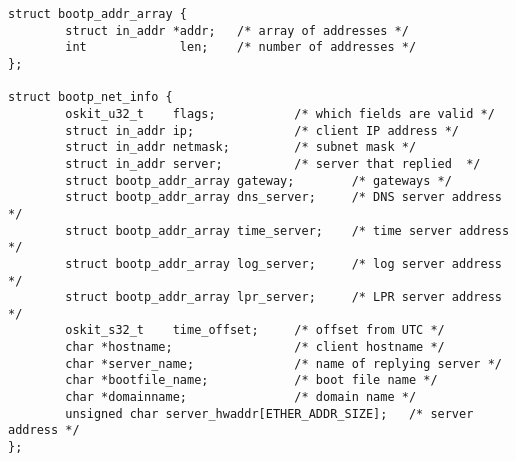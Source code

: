 \begin{apisyn}
\begin{codefrag}
\small
\begin{verbatim}
struct bootp_addr_array {
        struct in_addr *addr;   /* array of addresses */
        int             len;    /* number of addresses */
};

struct bootp_net_info {
        oskit_u32_t    flags;           /* which fields are valid */
        struct in_addr ip;              /* client IP address */
        struct in_addr netmask;         /* subnet mask */
        struct in_addr server;          /* server that replied  */
        struct bootp_addr_array gateway;        /* gateways */
        struct bootp_addr_array dns_server;     /* DNS server address  */
        struct bootp_addr_array time_server;    /* time server address  */
        struct bootp_addr_array log_server;     /* log server address  */
        struct bootp_addr_array lpr_server;     /* LPR server address  */
        oskit_s32_t    time_offset;     /* offset from UTC */
        char *hostname;                 /* client hostname */
        char *server_name;              /* name of replying server */
        char *bootfile_name;            /* boot file name */
        char *domainname;               /* domain name */
        unsigned char server_hwaddr[ETHER_ADDR_SIZE];   /* server address */
};
\end{verbatim}
\end{codefrag}
\end{apisyn}
